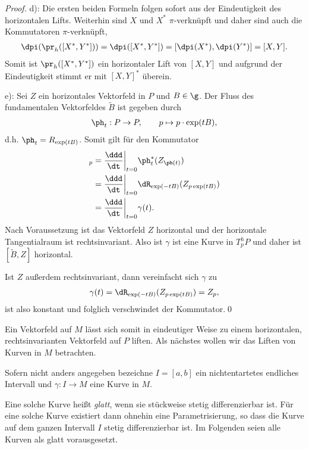 \documentclass[%
	paper=a5,%
	fleqn,%
	DIV=18,%
	BCOR=0mm,
	fontsize=11pt,
	titlepage=false,%
	bibliography=totoc,
	DIV=18,%
	twoside=true,
	pdftitle=Riemannsche Geometrie,
	pdfauthor=Uwe Semmelmann,
	numbers=noendperiod]%
	{scrbook}
\begin{document}
\begin{proof}
d): Die ersten beiden Formeln folgen sofort aus der Eindeutigkeit des
horizontalen Lifts. Weiterhin sind $X$ und $X^*$ $\pi$-verknüpft und daher sind
auch die Kommutatoren $\pi$-verknüpft,
\begin{align*}
\dpi(\pr_h([X^*,Y^*])) = 
\dpi([X^*,Y^*]) = 
[\dpi(X^*),\dpi(Y^*)] = [X,Y].
\end{align*}
Somit ist $\pr_h([X^*,Y^*])$ ein horizontaler Lift von $[X,Y]$ und aufgrund der
Eindeutigkeit stimmt er mit $[X,Y]^*$ überein.

e): Sei $Z$ ein horizontales Vektorfeld in $P$ und $B\in\g$. Der Fluss des
fundamentalen Vektorfeldes $\tilde{B}$ ist gegeben durch
\begin{align*}
\ph_t : P\to P,\qquad p\mapsto p\cdot \exp(tB), 
\end{align*}
d.h. $\ph_t = R_{\exp(tB)}$. Somit gilt für den Kommutator
\begin{align*}
[\tilde{B},Z]_p  &= \frac{\ddd}{\dt}\bigg|_{t=0} \ph_t^*(Z_{\ph(t)})\\
&= \frac{\ddd}{\dt}\bigg|_{t=0} \dR_{\exp(-tB)}(Z_{p\exp(tB)})\\
&= \frac{\ddd}{\dt}\bigg|_{t=0} \gamma(t).
\end{align*}
Nach Voraussetzung ist das Vektorfeld $Z$ horizontal und der horizontale Tangentialraum ist
rechtsinvariant. Also ist $\gamma$ ist eine Kurve in $T^h_pP$ und daher ist
$[\tilde{B},Z]$ horizontal.

Ist $Z$ außerdem rechts\-invariant, dann vereinfacht sich $\gamma$ zu
\begin{align*}
\gamma(t) = \dR_{\exp(-tB)}(Z_{p\exp(tB)}) = Z_p,
\end{align*}
ist also konstant und folglich verschwindet der Kommutator.\qed
\end{proof}

Ein Vektorfeld auf $M$ lässt sich somit in eindeutiger Weise zu einem
horizontalen, rechtsinvarianten Vektorfeld auf $P$ liften. Als nächstes wollen
wir das Liften von Kurven in $M$ betrachten. 


\begin{rem}
Sofern nicht anders angegeben bezeichne $I=[a,b]$ ein nichtentartetes endliches
Intervall und $\gamma: I\to M$ eine Kurve in $M$.

Eine solche Kurve heißt \textit{glatt}, wenn sie stückweise stetig
differenzierbar ist. Für eine solche Kurve existiert dann ohnehin eine
Parametrisierung, so dass die Kurve auf dem ganzen Intervall $I$ stetig
differenzierbar ist. Im Folgenden seien alle Kurven als glatt vorausgesetzt.
\map
\end{rem}
\end{document}
